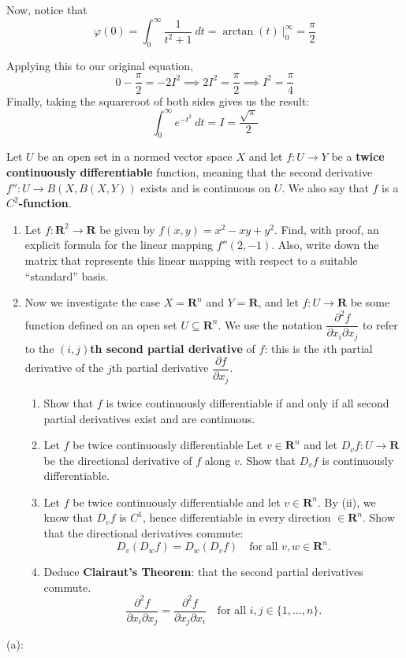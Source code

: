 \documentclass{article}
\newcommand{\R}{\mathbf{R}}
\theoremstyle{plain} %
\numberwithin{thm}{section} %
\theoremstyle{definition}
\begin{document}
\begin{question}{27}
    Now, notice that
    \[
        \varphi (0) = \int _0^{\infty} \frac{1}{t^2 + 1} \ dt = \arctan (t) \ \Big|_0^{\infty} = \frac{\pi}{2}
    \]

    Applying this to our original equation,
    \[
        0 - \frac{\pi}{2} = -2I^2 \implies 2I^2 = \frac{\pi}{2} \implies I^2 = \frac{\pi}{4}
    \]
    Finally, taking the squareroot of both sides gives us the result:
    \[
        \int_0^\infty e^{- t^2} \ dt = I = \frac{\sqrt{\pi}}{2}
    \]
    \end{question}
    \newpage
    \begin{question}{28}
        Let $U$ be an open set in a normed vector space $X$ and let $f:U\rightarrow Y$ be a \textbf{twice continuously differentiable} function, meaning that the second derivative $f'':U\rightarrow B(X,B(X,Y))$ exists and is continuous on $U$. We also say that $f$ is a \textbf{$C^2$-function}.
        \begin{enumerate}[label=(\alph*)]
            \item Let $f:\R^2\rightarrow \R$ be given by $f(x,y)=x^2-xy+y^2$. Find, with proof, an explicit formula for the linear mapping $f''(2,-1)$. Also, write down the matrix that represents this linear mapping with respect to a suitable ``standard'' basis.
            
            \item Now we investigate the case $X=\R^n$ and $Y=\R$, and let $f:U\rightarrow \R$ be some function defined on an open set $U\subseteq \R^n$. We use the notation $\dfrac{\partial^2 f}{\partial x_i\partial x_j}$ to refer to the \textbf{$(i,j)$th second partial derivative} of $f$: this is the $i$th partial derivative of the $j$th partial derivative $\dfrac{\partial f}{\partial x_j}$.
    

            \begin{enumerate}[label=(\roman*)]
                \item Show that $f$ is twice continuously differentiable if and only if all second partial derivatives exist and are continuous.

                \item Let $f$ be twice continuously differentiable Let $v\in \R^n$ and let $D_vf:U\rightarrow \R$ be the directional derivative of $f$ along $v$. Show that $D_vf$ is continuously differentiable.

                \item Let $f$ be twice continuously differentiable and let $v\in \R^n$. By (ii), we know that $D_vf$ is $C^1$, hence differentiable in every direction $\in \R^n$. Show that the directional derivatives commute:
                    \[ D_v(D_wf) = D_w(D_vf) \quad \text{for all $v,w\in \R^n$.} \]
                \item Deduce \textbf{Clairaut's Theorem}: that the second partial derivatives commute.
                \[ \dfrac{\partial^2 f}{\partial x_i\partial x_j} = \dfrac{\partial^2 f}{\partial x_j\partial x_i} \quad \text{for all $i,j\in \{1,\ldots,n\}$.} \]
            \end{enumerate}
        \end{enumerate}
        \tcblower
        (a):


\end{question}
\end{document}
